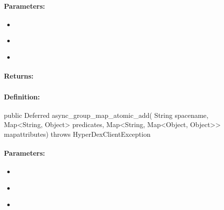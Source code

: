 \paragraph{Parameters:}
\begin{itemize}[noitemsep]
\item {}\\

\item {}\\

\item {}\\

\end{itemize}

\paragraph{Returns:}


\pagebreak
\subsubsection{}
\label{api:java:async_group_map_atomic_add}


\paragraph{Definition:}
\begin{javacode}
public Deferred async_group_map_atomic_add(
        String spacename,
        Map<String, Object> predicates,
        Map<String, Map<Object, Object>> mapattributes) throws HyperDexClientException
\end{javacode}

\paragraph{Parameters:}
\begin{itemize}[noitemsep]
\item {}\\

\item {}\\

\item {}\\

\end{itemize}

